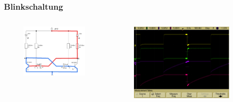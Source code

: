 \begin{frame}
    \frametitle{Blinkschaltung}
    \begin{columns}[c]
        \begin{figure}[H]
        \begin{center}
                \includegraphics[scale=0.25]{./img/schaltungen/blink_5.png}
        \end{center}
        \end{figure}
    \begin{figure}[H]
    \begin{center}
            \includegraphics[scale=0.12]{./img/oszi/blink_shade_2_5.png}

\end{center}
\end{figure}
\end{columns}
\end{frame}

